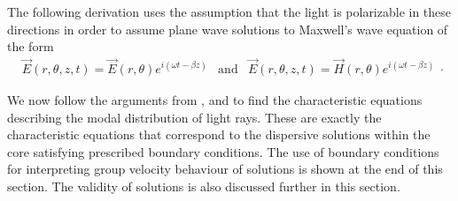 \documentclass[12pt]{article}
\theoremstyle{definition}
\numberwithin{equation}{section}
\begin{document}
{The following derivation uses the assumption that the light is polarizable in these directions in order to assume plane wave solutions to Maxwell's wave equation of the form
\begin{equation}
\begin{array}{lcr}
\vec{E}(r,\theta,z,t)=\vec{E}(r,\theta)e^{i(\omega t-\beta z)}&\mbox{and}&\vec{E}(r,\theta,z,t)=\vec{H}(r,\theta)e^{i(\omega t-\beta z)}
\end{array}.\label{solutions.eqn}
\end{equation}

We now follow the arguments from \cite{Belanger}, \cite{Okamoto} and \cite{Agrawal} to find the characteristic equations describing the modal distribution of light rays. These are exactly the characteristic equations that correspond to the dispersive solutions within the core satisfying prescribed boundary conditions. The use of boundary conditions for interpreting group velocity behaviour of solutions is shown at the end of this section. The validity of solutions is also discussed further in this section.

}
\end{document}
